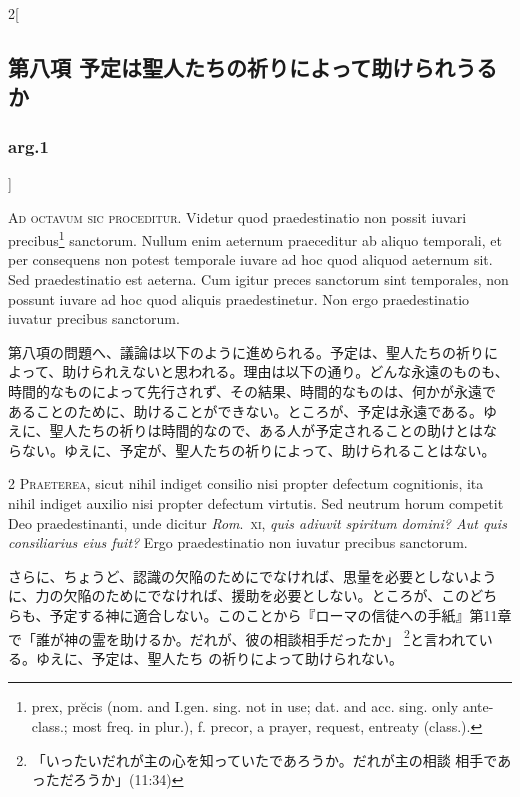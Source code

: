 \documentclass[paper=a4paper,fontsize=10pt,jafontsize=9pt,titlepage]{jlreq}
\begin{document}
\newpage







\begin{paracol}{2}[\subsection{第八項 予定は聖人たちの祈りによって助けられうるか}\subsubsection{arg.1}]

{\Huge A}{\scshape d octavum sic proceditur}. Videtur quod
praedestinatio non possit iuvari precibus\footnote
{prex, pr\u{e}cis (nom. and
I.gen. sing. not in use; dat. and acc. sing. only ante-class.; most freq. in plur.), f. precor, a prayer, request, entreaty (class.). 
} sanctorum. Nullum enim
aeternum praeceditur ab aliquo temporali, et per consequens non potest
temporale iuvare ad hoc quod aliquod aeternum sit. Sed praedestinatio
est aeterna. Cum igitur preces sanctorum sint temporales, non possunt
iuvare ad hoc quod aliquis praedestinetur. Non ergo praedestinatio
iuvatur precibus sanctorum.


\switchcolumn


第八項の問題へ、議論は以下のように進められる。予定は、聖人たちの祈りに
よって、助けられえないと思われる。理由は以下の通り。どんな永遠のものも、
時間的なものによって先行されず、その結果、時間的なものは、何かが永遠で
あることのために、助けることができない。ところが、予定は永遠である。ゆ
えに、聖人たちの祈りは時間的なので、ある人が予定されることの助けとはな
らない。ゆえに、予定が、聖人たちの祈りによって、助けられることはない。




{\scshape 2 Praeterea}, sicut nihil indiget consilio
nisi propter defectum cognitionis, ita nihil indiget auxilio nisi
propter defectum virtutis. Sed neutrum horum competit Deo
praedestinanti, unde dicitur {\itshape Rom}.~{\scshape xi}, {\itshape quis adiuvit spiritum domini? Aut
quis consiliarius eius fuit?} Ergo praedestinatio non iuvatur precibus
sanctorum.


\switchcolumn


さらに、ちょうど、認識の欠陥のためにでなければ、思量を必要としないよう
 に、力の欠陥のためにでなければ、援助を必要としない。ところが、このどち
 らも、予定する神に適合しない。このことから『ローマの信徒への手紙』第11章
 で「誰が神の霊を助けるか。だれが、彼の相談相手だったか」
 \footnote{「いったいだれが主の心を知っていたであろうか。だれが主の相談
 相手であっただろうか」(11:34)}と言われている。ゆえに、予定は、聖人たち
 の祈りによって助けられない。



\end{paracol}
\end{document}
